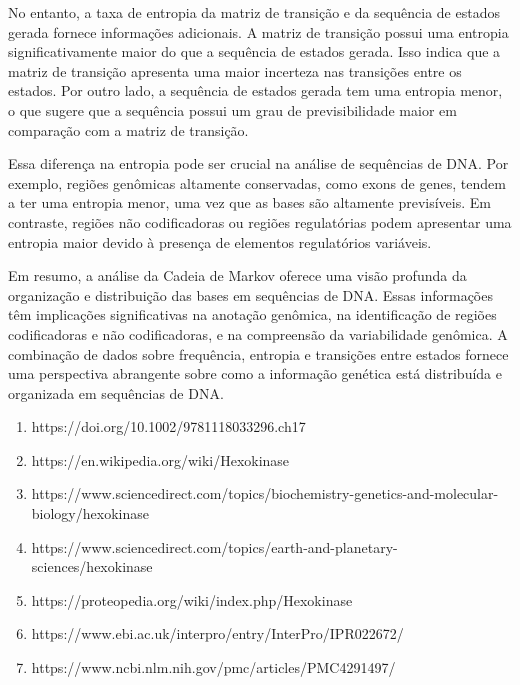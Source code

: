 \documentclass{article}
\begin{document}
    No entanto, a taxa de entropia da matriz de transição e da sequência de estados gerada fornece informações adicionais. A matriz de transição possui uma entropia significativamente maior do que a sequência de estados gerada. Isso indica que a matriz de transição apresenta uma maior incerteza nas transições entre os estados. Por outro lado, a sequência de estados gerada tem uma entropia menor, o que sugere que a sequência possui um grau de previsibilidade maior em comparação com a matriz de transição.
    
    Essa diferença na entropia pode ser crucial na análise de sequências de DNA. Por exemplo, regiões genômicas altamente conservadas, como exons de genes, tendem a ter uma entropia menor, uma vez que as bases são altamente previsíveis. Em contraste, regiões não codificadoras ou regiões regulatórias podem apresentar uma entropia maior devido à presença de elementos regulatórios variáveis.
    
    Em resumo, a análise da Cadeia de Markov oferece uma visão profunda da organização e distribuição das bases em sequências de DNA. Essas informações têm implicações significativas na anotação genômica, na identificação de regiões codificadoras e não codificadoras, e na compreensão da variabilidade genômica. A combinação de dados sobre frequência, entropia e transições entre estados fornece uma perspectiva abrangente sobre como a informação genética está distribuída e organizada em sequências de DNA.    
    


\begin{enumerate}
    \item 
    https://doi.org/10.1002/9781118033296.ch17
    \item https://en.wikipedia.org/wiki/Hexokinase
    \item https://www.sciencedirect.com/topics/biochemistry-genetics-and-molecular-biology/hexokinase
    \item https://www.sciencedirect.com/topics/earth-and-planetary-sciences/hexokinase
    \item https://proteopedia.org/wiki/index.php/Hexokinase
    \item https://www.ebi.ac.uk/interpro/entry/InterPro/IPR022672/
    \item https://www.ncbi.nlm.nih.gov/pmc/articles/PMC4291497/
    
\end{enumerate}
\end{document}
